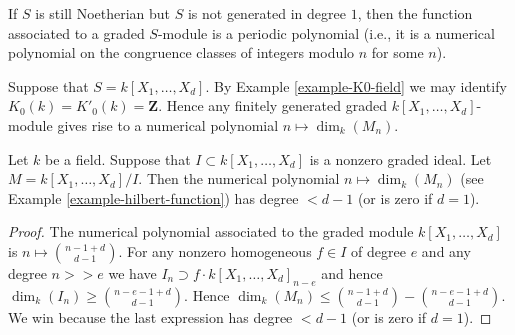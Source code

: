 \begin{remark}
\label{remark-period-polynomial}
If $S$ is still Noetherian but $S$ is not generated in degree $1$,
then the function associated to a graded $S$-module is a periodic
polynomial (i.e., it is a numerical polynomial on the
congruence classes of integers modulo $n$ for some $n$).
\end{remark}

\begin{example}
\label{example-hilbert-function}
Suppose that $S = k[X_1, \ldots, X_d]$.
By Example \ref{example-K0-field} we may identify
$K_0(k) = K'_0(k) = \mathbf{Z}$. Hence any finitely
generated graded $k[X_1, \ldots, X_d]$-module
gives rise to a numerical polynomial
$n \mapsto \dim_k(M_n)$.
\end{example}

\begin{lemma}
\label{lemma-quotient-smaller-d}
Let $k$ be a field. Suppose that $I \subset k[X_1, \ldots, X_d]$
is a nonzero graded ideal. Let $M = k[X_1, \ldots, X_d]/I$.
Then the numerical polynomial $n \mapsto \dim_k(M_n)$ (see
Example \ref{example-hilbert-function})
has degree $ < d - 1$ (or is zero if $d = 1$).
\end{lemma}

\begin{proof}
The numerical polynomial associated to the graded module
$k[X_1, \ldots, X_d]$ is $n \mapsto \binom{n - 1 + d}{d - 1}$.
For any nonzero homogeneous $f \in I$ of degree $e$
and any degree $n >> e$ we have $I_n \supset f \cdot k[X_1, \ldots, X_d]_{n-e}$
and hence $\dim_k(I_n) \geq \binom{n - e - 1 + d}{d - 1}$. Hence
$\dim_k(M_n) \leq \binom{n - 1 + d}{d - 1} - \binom{n - e - 1 + d}{d - 1}$.
We win because the last expression
has degree $ < d - 1$ (or is zero if $d = 1$).
\end{proof}








